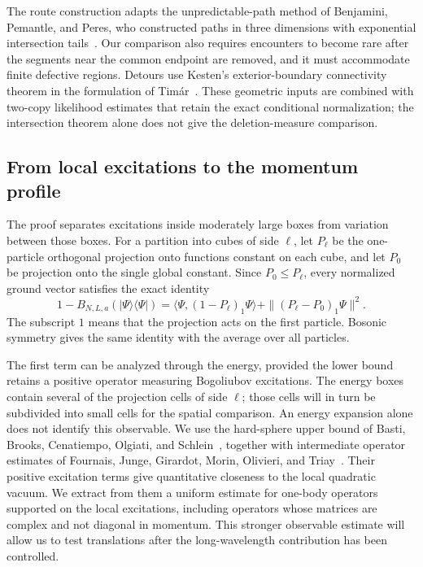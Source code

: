 The route construction adapts the unpredictable-path method of
Benjamini, Pemantle, and Peres, who constructed paths in three dimensions
with exponential intersection tails~\cite{BPP}. Our comparison also
requires encounters to become rare after the segments near the common
endpoint are removed, and it must accommodate finite defective regions.
Detours use Kesten's exterior-boundary connectivity theorem in the
formulation of Tim\'ar~\cite[Theorem~4]{Timar}. These geometric inputs
are combined with two-copy likelihood estimates that retain the exact
conditional normalization; the
intersection theorem alone does not give the deletion-measure comparison.

\subsection{From local excitations to the momentum profile}

The proof separates excitations inside moderately large boxes from
variation between those boxes. For a partition into cubes of side $\ell$,
let $P_\ell$ be the one-particle orthogonal projection onto functions
constant on each cube, and let $P_0$ be projection onto the single global
constant. Since $P_0\le P_\ell$, every normalized ground vector satisfies
the exact identity
\begin{equation}\label{intro:split}
 1-B_{N,L,a}(|\Psi\rangle\langle\Psi|)
 =\langle\Psi,(1-P_\ell)_1\Psi\rangle
   +\|(P_\ell-P_0)_1\Psi\|^2.
\end{equation}
The subscript $1$ means that the projection acts on the first particle.
Bosonic symmetry gives the same identity with the average over all particles.

The first term can be analyzed through the energy, provided the lower
bound retains a positive operator measuring Bogoliubov excitations.
The energy boxes contain several of the projection cells of side $\ell$;
those cells will in turn be subdivided into small cells for the spatial
comparison.
An energy expansion alone does not identify this observable. We use
the hard-sphere upper bound of Basti, Brooks, Cenatiempo, Olgiati,
and Schlein~\cite{BBCOS}, together with intermediate operator estimates
of Fournais, Junge, Girardot, Morin, Olivieri, and Triay~\cite{FJGMOT}.
Their positive excitation terms give quantitative closeness to the
local quadratic vacuum. We extract from them a uniform estimate for
one-body operators supported on the local excitations, including operators
whose matrices are complex and not diagonal in momentum. This stronger
observable estimate will allow us to test translations after the
long-wavelength contribution has been controlled.

